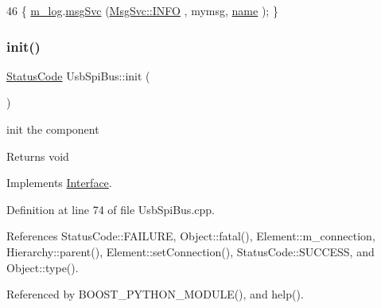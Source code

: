 \begin{DoxyCode}
46 \{ \hyperlink{classObject_a0d269813dd7ac1f24bc143031e2963f2}{m\_log}.\hyperlink{classMsgSvc_ad25f18047920cc59a314e5098259711c}{msgSvc} (\hyperlink{classMsgSvc_ae671eb7301996cd049d2da8a65925926ad2fcf3f3e734fc41ee097cc23670ce51}{MsgSvc::INFO}    , mymsg, \hyperlink{classObject_a300f4c05dd468c7bb8b3c968868443c1}{name} ); \}
\end{DoxyCode}
\mbox{\label{classUsbSpiBus_a38203aaf0806b9a1c7cc0686831a7ce9}} 
\subsubsection{\texorpdfstring{init()}{init()}}
{\footnotesize\ttfamily \hyperlink{classStatusCode}{Status\+Code} Usb\+Spi\+Bus\+::init (\begin{DoxyParamCaption}{ }\end{DoxyParamCaption})\hspace{0.3cm}{\ttfamily [virtual]}}

init the component

\begin{DoxyReturn}{Returns}
void 
\end{DoxyReturn}


Implements \hyperlink{classInterface_a1d095c113b1e89d1f5f68323856fee63}{Interface}.



Definition at line 74 of file Usb\+Spi\+Bus.\+cpp.



References Status\+Code\+::\+F\+A\+I\+L\+U\+RE, Object\+::fatal(), Element\+::m\+\_\+connection, Hierarchy\+::parent(), Element\+::set\+Connection(), Status\+Code\+::\+S\+U\+C\+C\+E\+SS, and Object\+::type().



Referenced by B\+O\+O\+S\+T\+\_\+\+P\+Y\+T\+H\+O\+N\+\_\+\+M\+O\+D\+U\+L\+E(), and help().


